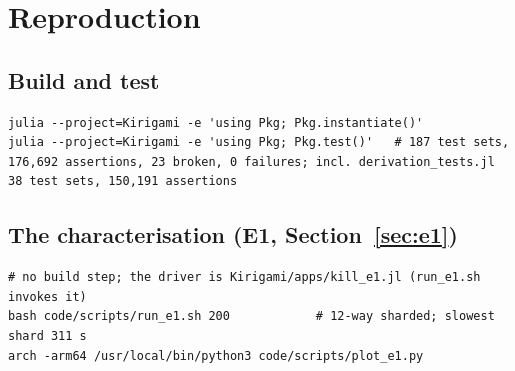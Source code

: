 \documentclass[11pt,a4paper]{article}
\theoremstyle{definition}
\begin{document}
\section{Reproduction}

\subsection*{Build and test}
\begin{verbatim}
julia --project=Kirigami -e 'using Pkg; Pkg.instantiate()'
julia --project=Kirigami -e 'using Pkg; Pkg.test()'   # 187 test sets, 176,692 assertions, 23 broken, 0 failures; incl. derivation_tests.jl 38 test sets, 150,191 assertions
\end{verbatim}

\subsection*{The characterisation (E1, Section~\ref{sec:e1})}
\begin{verbatim}
# no build step; the driver is Kirigami/apps/kill_e1.jl (run_e1.sh invokes it)
bash code/scripts/run_e1.sh 200            # 12-way sharded; slowest shard 311 s
arch -arm64 /usr/local/bin/python3 code/scripts/plot_e1.py
\end{verbatim}
\end{document}
